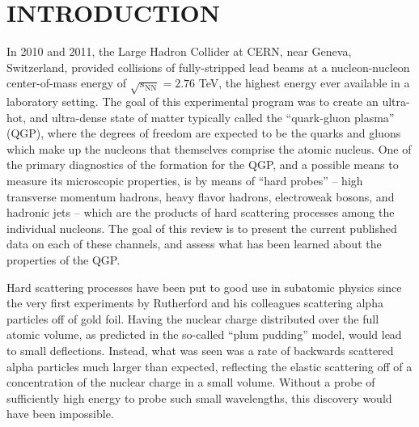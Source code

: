 \section{INTRODUCTION}
\label{introduction}

In 2010 and 2011, the Large Hadron Collider at CERN, near Geneva, Switzerland, provided collisions of
fully-stripped lead beams at a nucleon-nucleon center-of-mass energy of $\sqrt{s_{\mathrm{NN}}}=2.76$ TeV,
the highest energy ever available in a laboratory setting.  
The goal of this experimental program was to create an ultra-hot, and ultra-dense state 
of matter typically called the ``quark-gluon plasma'' (QGP), where the degrees of freedom are expected to be the 
quarks and gluons which make up the nucleons that themselves comprise the atomic nucleus.
One of the primary diagnostics of the formation for the QGP, and a possible means to measure its microscopic
properties, is by means of ``hard probes'' -- high transverse momentum hadrons, heavy flavor hadrons,
electroweak bosons, and hadronic jets -- which are the products of hard scattering processes among the
individual nucleons.  
The goal of this review is to present the current published data on each of these channels, and assess
what has been learned about the properties of the QGP.

Hard scattering processes have been put to good use in subatomic physics since the
very first experiments by Rutherford and his colleagues scattering alpha particles off of gold foil.
Having the nuclear charge distributed over the full atomic volume, as predicted in the so-called
``plum pudding'' model, would lead to small deflections.  Instead, what was seen was a rate of
backwards scattered alpha particles much larger than expected, reflecting the elastic scattering off
of a concentration of the nuclear charge in a small volume.  
Without a probe of sufficiently high energy to probe such small wavelengths, this discovery would 
have been impossible.  

